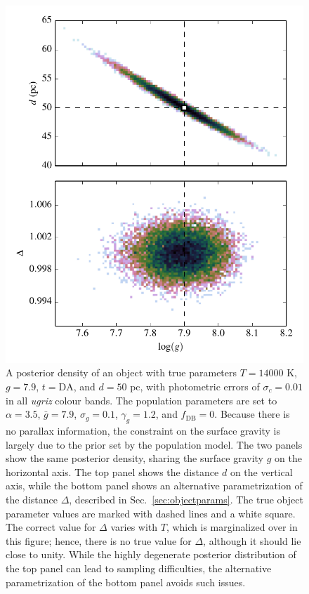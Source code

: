 \documentclass[fleqn,usenatbib]{mnras}
\newcommand{\Teff}{T}
\newcommand{\logg}{g}
\begin{document}
\begin{figure}
	\includegraphics[width=\columnwidth]{banana.pdf}
    \caption{A posterior density of an object with true parameters $\Teff=14000$ K, $\logg=7.9$, $t=\text{DA}$, and $d=50$ pc, with photometric errors of $\sigma_c=0.01$ in all \emph{ugriz} colour bands. The population parameters are set to $\alpha=3.5$, $\bar{g}=7.9$, $\sigma_g=0.1$, $\gamma_g=1.2$, and $f_\text{DB}=0$. Because there is no parallax information, the constraint on the surface gravity is largely due to the prior set by the population model. The two panels show the same posterior density, sharing the surface gravity $\logg$ on the horizontal axis. The top panel shows the distance $d$ on the vertical axis, while the bottom panel shows an alternative parametrization of the distance $\Delta$, described in Sec.~\ref{sec:objectparams}. The true object parameter values are marked with dashed lines and a white square. The correct value for $\Delta$ varies with $\Teff$, which is marginalized over in this figure; hence, there is no true value for $\Delta$, although it should lie close to unity. While the highly degenerate posterior distribution of the top panel can lead to sampling difficulties, the alternative parametrization of the bottom panel avoids such issues.}
    \label{fig:banana}
\end{figure}
\end{document}
